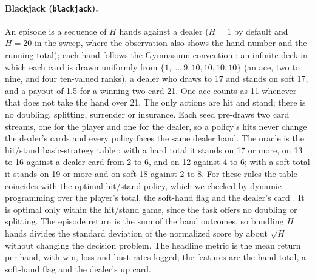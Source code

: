 \paragraph{Blackjack (\texttt{blackjack}).}
An episode is a sequence of $H$ hands against a dealer ($H=1$ by default and $H=20$ in the sweep, where the observation also shows the hand number and the running total); each hand follows the Gymnasium convention \citep{towers2025gymnasium}: an infinite deck in which each card is drawn uniformly from $\{1,\dots,9,10,10,10,10\}$ (an ace, two to nine, and four ten-valued ranks), a dealer who draws to 17 and stands on soft 17, and a payout of 1.5 for a winning two-card 21. One ace counts as 11 whenever that does not take the hand over 21. The only actions are hit and stand; there is no doubling, splitting, surrender or insurance. Each seed pre-draws two card streams, one for the player and one for the dealer, so a policy's hits never change the dealer's cards and every policy faces the same dealer hand. The oracle is the hit/stand basic-strategy table \citep{baldwin1956optimum}: with a hard total it stands on 17 or more, on 13 to 16 against a dealer card from 2 to 6, and on 12 against 4 to 6; with a soft total it stands on 19 or more and on soft 18 against 2 to 8. For these rules the table coincides with the optimal hit/stand policy, which we checked by dynamic programming over the player's total, the soft-hand flag and the dealer's card \citep{sutton2018rl}. It is optimal only within the hit/stand game, since the task offers no doubling or splitting. The episode return is the sum of the hand outcomes, so bundling $H$ hands divides the standard deviation of the normalized score by about $\sqrt{H}$ without changing the decision problem. The headline metric is the mean return per hand, with win, loss and bust rates logged; the features are the hand total, a soft-hand flag and the dealer's up card.

